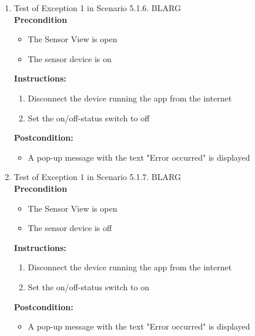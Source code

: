 \documentclass[a4paper]{article}
\newlength{\testlabellength}
\newenvironment{testlist}{\begin{enumerate}[label=\bfseries Instruction \thesubsection.\arabic* , labelindent=0pt, labelwidth=\testlabellength , leftmargin=2cm]}{\end{enumerate}}
\newenvironment{precondition}{
{\color{white}BLARG}\\ 
\textbf{Precondition}
\begin{itemize}[labelindent=0cm, labelwidth=2cm , leftmargin=1cm]
}
{\end{itemize}}
\newenvironment{instruction}{
\textbf{Instructions:}
\begin{enumerate}[label=\bfseries  \arabic*., labelindent=0cm, labelwidth=2cm , leftmargin=1cm]
}
{\end{enumerate}}
\newenvironment{postcondition}{
\textbf{Postcondition:}
\begin{itemize}[labelindent=0cm, labelwidth=2cm , leftmargin=1cm]
}
{\end{itemize}}
\begin{document}
\begin{appendices}
\begin{testlist}
	\item  Test of Exception 1 in Scenario 5.1.6.
		\begin{precondition}
			\item The Sensor View is open
			\item The sensor device is on
		\end{precondition}
		\begin{instruction}
			\item Disconnect the device running the app from the internet
			\item Set the on/off-status switch to off
		\end{instruction}
		\begin{postcondition}
			\item A pop-up message with the text "Error occurred" is displayed
		\end{postcondition}
		
	\item Test of Exception 1 in Scenario 5.1.7.
		\begin{precondition}
			\item The Sensor View is open
			\item The sensor device is off
		\end{precondition}
		\begin{instruction}
			\item Disconnect the device running the app from the internet
			\item Set the on/off-status switch to on
		\end{instruction}
		\begin{postcondition}
			\item A pop-up message with the text "Error occurred" is displayed
		\end{postcondition}
		

\end{testlist}
\end{appendices}
\end{document}
